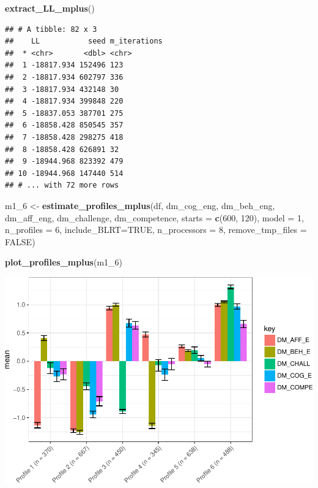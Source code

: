 \documentclass[]{msu-thesis}
\newenvironment{Shaded}{\begin{snugshade}}{\end{snugshade}}
\newcommand{\KeywordTok}[1]{\textcolor[rgb]{0.13,0.29,0.53}{\textbf{#1}}}
\newcommand{\DataTypeTok}[1]{\textcolor[rgb]{0.13,0.29,0.53}{#1}}
\newcommand{\DecValTok}[1]{\textcolor[rgb]{0.00,0.00,0.81}{#1}}
\newcommand{\StringTok}[1]{\textcolor[rgb]{0.31,0.60,0.02}{#1}}
\newcommand{\OtherTok}[1]{\textcolor[rgb]{0.56,0.35,0.01}{#1}}
\newcommand{\NormalTok}[1]{#1}
\theoremstyle{definition}
\theoremstyle{definition}
\theoremstyle{definition}
\theoremstyle{remark}
\begin{document}
\begin{Shaded}
\begin{Highlighting}[]
\KeywordTok{extract_LL_mplus}\NormalTok{()}
\end{Highlighting}
\end{Shaded}

\begin{verbatim}
## # A tibble: 82 x 3
##    LL           seed m_iterations
##  * <chr>       <dbl> <chr>       
##  1 -18817.934 152496 123         
##  2 -18817.934 602797 336         
##  3 -18817.934 432148 30          
##  4 -18817.934 399848 220         
##  5 -18837.053 387701 275         
##  6 -18858.428 850545 357         
##  7 -18858.428 298275 418         
##  8 -18858.428 626891 32          
##  9 -18944.968 823392 479         
## 10 -18944.968 147440 514         
## # ... with 72 more rows
\end{verbatim}

\begin{Shaded}
\begin{Highlighting}[]
\NormalTok{m1_}\DecValTok{6}\NormalTok{ <-}\StringTok{ }\KeywordTok{estimate_profiles_mplus}\NormalTok{(df,  }
\NormalTok{                             dm_cog_eng, dm_beh_eng, dm_aff_eng, dm_challenge, dm_competence,}
                             \DataTypeTok{starts =} \KeywordTok{c}\NormalTok{(}\DecValTok{600}\NormalTok{, }\DecValTok{120}\NormalTok{),}
                             \DataTypeTok{model =} \DecValTok{1}\NormalTok{,}
                             \DataTypeTok{n_profiles =} \DecValTok{6}\NormalTok{,}
                             \DataTypeTok{include_BLRT=}\OtherTok{TRUE}\NormalTok{,}
                             \DataTypeTok{n_processors =} \DecValTok{8}\NormalTok{, }\DataTypeTok{remove_tmp_files =} \OtherTok{FALSE}\NormalTok{)}

\KeywordTok{plot_profiles_mplus}\NormalTok{(m1_}\DecValTok{6}\NormalTok{)}
\end{Highlighting}
\end{Shaded}

\includegraphics{rosenberg-dissertation_files/figure-latex/spec-solutions-model1-4.pdf}
\end{document}
